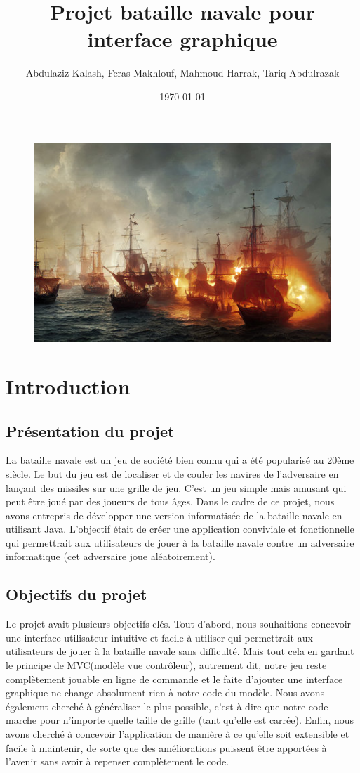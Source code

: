 \documentclass[12pt]{article}
\title{Projet bataille navale pour interface graphique}
\author{Abdulaziz Kalash,
Feras Makhlouf,
Mahmoud Harrak,
Tariq Abdulrazak}
\date{\today}
\begin{document}
\maketitle 
\begin{figure}[h]
\includegraphics[scale=1.2]{bateau.jpg}
\end{figure}
\newpage
\tableofcontents 

\newpage 

\section{Introduction}

\subsection{Présentation du projet}
La bataille navale est un jeu de société bien connu qui a été popularisé au 20ème siècle. Le but du jeu est de localiser et de couler les navires de l'adversaire en lançant des missiles sur une grille de jeu. C'est un jeu simple mais amusant qui peut être joué par des joueurs de tous âges.
Dans le cadre de ce projet, nous avons entrepris de développer une version informatisée de la bataille navale en utilisant Java. L'objectif était de créer une application conviviale et fonctionnelle qui permettrait aux utilisateurs de jouer à la bataille navale contre un adversaire informatique (cet adversaire joue aléatoirement).
\subsection{Objectifs du projet}
Le projet avait plusieurs objectifs clés. Tout d'abord, nous souhaitions concevoir une interface utilisateur intuitive et facile à utiliser qui permettrait aux utilisateurs de jouer à la bataille navale sans difficulté. 
Mais tout cela en gardant le principe de MVC(modèle vue contrôleur), autrement dit, notre jeu reste complètement jouable en ligne de commande et le faite d'ajouter une interface graphique ne change absolument rien à notre code du modèle.
Nous avons également cherché à généraliser le plus possible, c'est-à-dire que notre code marche pour n'importe quelle taille de grille (tant qu'elle est carrée).
Enfin, nous avons cherché à concevoir l'application de manière à ce qu'elle soit extensible et facile à maintenir, de sorte que des améliorations puissent être apportées à l'avenir sans avoir à repenser complètement le code.
\end{document}
